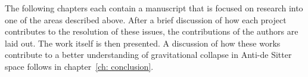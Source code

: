 \documentclass[../PhD.tex]{subfiles}
\begin{document}
The following chapters each contain a manuscript that is focused on research into one of the areas described above. After a brief discussion of how each project contributes to the resolution of these issues, the contributions of the authors are laid out. The work itself is then presented. A discussion of how these works contribute to a better understanding of gravitational collapse in Anti-de Sitter space follows in chapter~\ref{ch: conclusion}.



\end{document}
